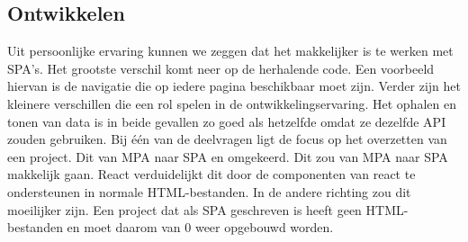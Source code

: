 \documentclass{hogent-article}
\begin{document}
\subsection{Ontwikkelen}
Uit persoonlijke ervaring kunnen we zeggen dat het makkelijker is te werken met SPA's.
Het grootste verschil komt neer op de herhalende code.
Een voorbeeld hiervan is de navigatie die op iedere pagina beschikbaar moet zijn.
Verder zijn het kleinere verschillen die een rol spelen in de ontwikkelingservaring.
Het ophalen en tonen van data is in beide gevallen zo goed als hetzelfde omdat ze dezelfde API zouden gebruiken.
Bij één van de deelvragen ligt de focus op het overzetten van een project.
Dit van MPA naar SPA en omgekeerd.
Dit zou van MPA naar SPA makkelijk gaan.
React verduidelijkt dit door de componenten van react te ondersteunen in normale HTML-bestanden.
In de andere richting zou dit moeilijker zijn.
Een project dat als SPA geschreven is heeft geen HTML-bestanden en moet daarom van 0 weer opgebouwd worden.

\printbibliography[heading=bibintoc]

\end{document}
